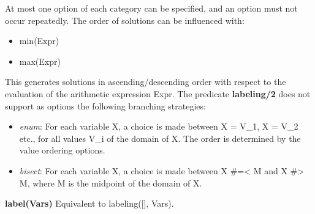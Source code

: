 At most one option of each category can be specified, and an option must not occur repeatedly.\newline
The order of solutions can be influenced with:\newline
\begin{itemize}
    \item min(Expr)
    \item max(Expr)
\end{itemize}

This generates solutions in ascending/descending order with respect to the evaluation of the arithmetic expression Expr.\newline
The predicate \textbf{labeling/2} does not support as options the following branching strategies:
\begin{itemize}
    \item \textit{enum}: For each variable X, a choice is made between X = V\_1, X = V\_2 etc., for all values V\_i of the domain of X. The order is determined by the value ordering options.
    \item \textit{bisect}: For each variable X, a choice is made between X \#=< M and X \#> M, where M is the midpoint of the domain of X.
\end{itemize}
\textbf{label(Vars)}\newline\newline
Equivalent to labeling([], Vars).


